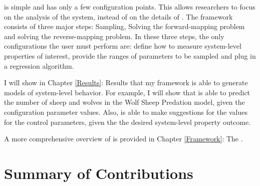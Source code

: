 \fw is simple and has only a few configuration points.
This allows researchers to focus on the analysis of the system, instead of on the details of \fw.
The framework consists of three major steps: Sampling, Solving the forward-mapping problem and solving the reverse-mapping problem.
In these three steps, the only configurations the user must perform are: define how to measure system-level properties of interest, provide the ranges of parameters to be sampled and plug in a regression algorithm.

I will show in Chapter \ref{Results}: Results that my framework is able to generate models of system-level behavior.
For example, I will show that \fw is able to predict the number of sheep and wolves in the Wolf Sheep Predation model, given the configuration parameter values.
Also, \fw is able to make suggestions for the values for the control parameters, given the the desired system-level property outcome.

A more comprehensive overview of \fw is provided in Chapter \ref{Framework}: The \framework.



\section{Summary of Contributions}



